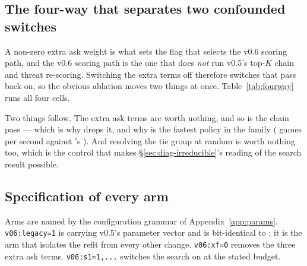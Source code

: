 \subsection{The four-way that separates two confounded switches}
\label{app:abl-fourway}

A non-zero extra ask weight is what sets the flag that selects the v0.6 scoring path, and the v0.6
scoring path is the one that does \emph{not} run v0.5's top-$K$ chain and threat re-scoring.
Switching the extra terms off therefore switches that pass back on, so the obvious ablation moves
two things at once. Table~\ref{tab:fourway} runs all four cells.

\begin{table}[h]\centering
\caption{The four-way. A negative delta means the variant beats \vsix{}. All four are null.}
\label{tab:fourway}

\end{table}

Two things follow. The extra ask terms are worth nothing, and so is the chain pass --- which is why
\vsix{} drops it, and why \vsix{} is the fastest policy in the family
(\vsixThroughputSix{} games per second against \vfive{}'s \vsixThroughputFive{}). And resolving
the tie group at random is worth nothing too, which is the control that makes
\S\ref{sec:diag-irreducible}'s reading of the search result possible.

\subsection{Specification of every arm}
\label{app:abl-specs}

Arms are named by the configuration grammar of Appendix~\ref{app:params}. \texttt{v06:legacy=1} is
\vsix{} carrying v0.5's parameter vector and is bit-identical to \vfive{}; it is the arm that
isolates the refit from every other change. \texttt{v06:xf=0} removes the three extra ask terms.
\texttt{v06:s1=1,...} switches the search on at the stated budget.
